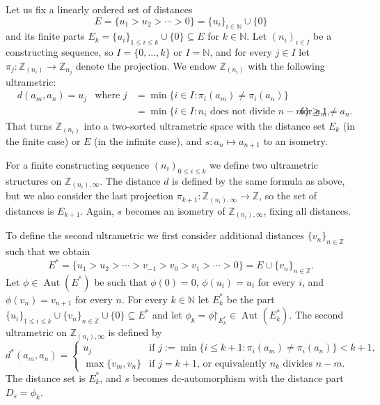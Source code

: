 \documentclass[oneside,notitlepage,12pt]{article}
\theoremstyle{definition}
\theoremstyle{remark}
\newcommand \set [1]{\{#1\}}
\newcommand \maps {\colon} %
\newcommand \restr [1] {\mathord{\upharpoonright}_{#1}}
\newcommand \subs {\subseteq}
\newcommand \N {\mathbb{N}}
\newcommand \Z {\mathbb{Z}}
\newcommand \Aut {\operatorname{Aut}}
\let \aut \Aut
\begin{document}
Let us fix a linearly ordered set of distances
\[
    E = \set{u_1 > u_2 > \cdots > 0} = \set{u_i}_{i \in \N}  \cup \set{0}
\]
and its finite parts $E_k = \set{u_i}_{1 \leq i \leq k} \cup \set{0} \subs E$ for $k \in \N$.
Let $(n_i)_{i \in I}$ be a constructing sequence, so $I = \set{0, \ldots, k}$ or $I = \N$, and for every $j \in I$ let $\pi_j\maps \Z_{(n_i)} \to \Z_{n_j}$ denote the projection.
We endow $\Z_{(n_i)}$ with the following ultrametric:
\begin{align*}
    &d(a_m, a_n) = u_j & \text{where } j &= \min\set{i \in I: \pi_i(a_m) \neq \pi_i(a_n)} \\
        && &= \min\set{i \in I: n_i \text{ does not divide } n - m} \geq 1, & \text{for $a_m \neq a_n$}.
\end{align*}
That turns $\Z_{(n_i)}$ into a two-sorted ultrametric space with the distance set $E_k$ (in the finite case) or $E$ (in the infinite case), and $s\maps a_n \mapsto a_{n + 1}$ to  an isometry.

For a finite constructing sequence $(n_i)_{0 \leq i \leq k}$ we define two ultrametric structures on $\Z_{(n_i),\infty}$.
The distance $d$ is defined by the same formula as above, but we also consider the last projection $\pi_{k + 1} \maps \Z_{(n_i), \infty} \to \Z$, so the set of distances is $E_{k + 1}$.
Again, $s$ becomes an isometry of $\Z_{(n_i), \infty}$, fixing all distances.

To define the second ultrametric we first consider additional distances $\set{v_n}_{n \in \Z}$ such that we obtain
\[
    E^* = \set{u_1 > u_2 > \cdots > v_{-1} > v_0 > v_1 > \cdots > 0} = E \cup \set{v_n}_{n \in \Z}.
\]
Let $\phi \in \aut(E^*)$ be such that $\phi(0) = 0$, $\phi(u_i) = u_i$ for every $i$, and $\phi(v_n) = v_{n + 1}$ for every $n$.
For every $k \in \N$ let $E^*_k$ be the part $\set{u_i}_{1 \leq i \leq k} \cup \set{v_n}_{n \in \Z} \cup \set{0} \subs E^*$ and let $\phi_k = \phi\restr{E^*_k} \in \aut(E^*_k)$.
The second ultrametric on $\Z_{(n_i), \infty}$ is defined by 
\[
d^*(a_m, a_n) = \begin{cases}
    u_j & \text{if $j := \min\set{i \leq k + 1: \pi_i(a_m) \neq \pi_i(a_n)} < k + 1$,} \\
    \max\set{v_m, v_n} & \text{if $j = k + 1$, or equivalently $n_k$ divides $n - m$.}
\end{cases}
\]
The distance set is $E^*_k$, and $s$ becomes dc-automorphism with the distance part $D_s = \phi_k$.
\end{document}
